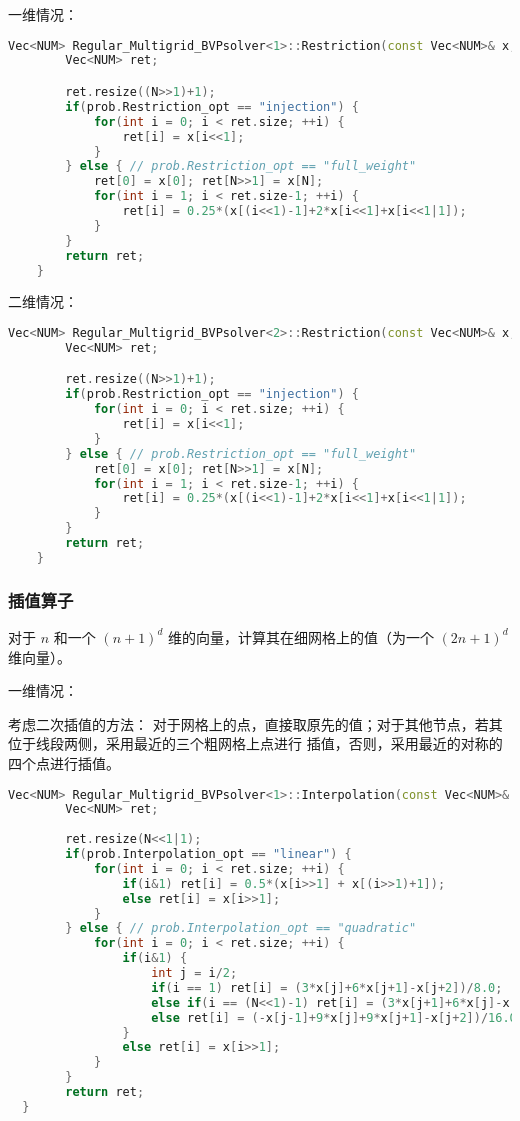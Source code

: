 \documentclass[lang=cn,a4paper,newtx,bibend=bibtex]{elegantpaper}
\begin{document}
一维情况：
\begin{lstlisting}[language=C++]
  Vec<NUM> Regular_Multigrid_BVPsolver<1>::Restriction(const Vec<NUM>& x, const int N) {
        Vec<NUM> ret;

        ret.resize((N>>1)+1);
        if(prob.Restriction_opt == "injection") {
            for(int i = 0; i < ret.size; ++i) {
                ret[i] = x[i<<1];
            }
        } else { // prob.Restriction_opt == "full_weight"
            ret[0] = x[0]; ret[N>>1] = x[N];
            for(int i = 1; i < ret.size-1; ++i) {
                ret[i] = 0.25*(x[(i<<1)-1]+2*x[i<<1]+x[i<<1|1]);
            }
        }
        return ret;
    }
\end{lstlisting}

二维情况：
\begin{lstlisting}[language=C++]
  Vec<NUM> Regular_Multigrid_BVPsolver<2>::Restriction(const Vec<NUM>& x, const int N) {
        Vec<NUM> ret;

        ret.resize((N>>1)+1);
        if(prob.Restriction_opt == "injection") {
            for(int i = 0; i < ret.size; ++i) {
                ret[i] = x[i<<1];
            }
        } else { // prob.Restriction_opt == "full_weight"
            ret[0] = x[0]; ret[N>>1] = x[N];
            for(int i = 1; i < ret.size-1; ++i) {
                ret[i] = 0.25*(x[(i<<1)-1]+2*x[i<<1]+x[i<<1|1]);
            }
        }
        return ret;
    }
\end{lstlisting}


\subsubsection{插值算子}

对于 $n$ 和一个 $(n+1)^d$ 维的向量，计算其在细网格上的值（为一个 $(2n+1)^d$ 维向量）。

一维情况：

考虑二次插值的方法：
对于网格上的点，直接取原先的值；对于其他节点，若其位于线段两侧，采用最近的三个粗网格上点进行
插值，否则，采用最近的对称的四个点进行插值。

\begin{lstlisting}[language=C++]
  Vec<NUM> Regular_Multigrid_BVPsolver<1>::Interpolation(const Vec<NUM>& x, const int N) {
        Vec<NUM> ret;
        
        ret.resize(N<<1|1);
        if(prob.Interpolation_opt == "linear") {
            for(int i = 0; i < ret.size; ++i) {
                if(i&1) ret[i] = 0.5*(x[i>>1] + x[(i>>1)+1]);
                else ret[i] = x[i>>1];
            }
        } else { // prob.Interpolation_opt == "quadratic"
            for(int i = 0; i < ret.size; ++i) {
                if(i&1) {
                    int j = i/2;
                    if(i == 1) ret[i] = (3*x[j]+6*x[j+1]-x[j+2])/8.0;
                    else if(i == (N<<1)-1) ret[i] = (3*x[j+1]+6*x[j]-x[j-1])/8.0;
                    else ret[i] = (-x[j-1]+9*x[j]+9*x[j+1]-x[j+2])/16.0;
                }
                else ret[i] = x[i>>1];
            }
        }
        return ret;
  }
\end{lstlisting}
\end{document}
